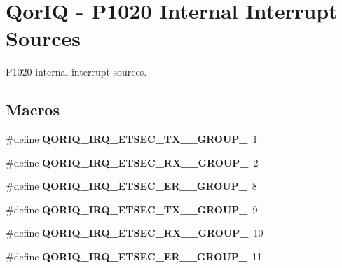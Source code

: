 \hypertarget{group__QoriqInterruptP1020}{}\section{Qor\+IQ -\/ P1020 Internal Interrupt Sources}
\label{group__QoriqInterruptP1020}


P1020 internal interrupt sources.  


\subsection*{Macros}
\begin{DoxyCompactItemize}
\item 
\mbox{\label{group__QoriqInterruptP1020_ga21b9ecdfa1405b1ab54c2769b2bcfaf0}} 
\#define {\bfseries Q\+O\+R\+I\+Q\+\_\+\+I\+R\+Q\+\_\+\+E\+T\+S\+E\+C\+\_\+\+T\+X\+\_\+\_\+\+G\+R\+O\+U\+P\+\_}~1
\item 
\mbox{\label{group__QoriqInterruptP1020_ga2333f3c95502a7760e3f6df947c5f6bf}} 
\#define {\bfseries Q\+O\+R\+I\+Q\+\_\+\+I\+R\+Q\+\_\+\+E\+T\+S\+E\+C\+\_\+\+R\+X\+\_\+\_\+\+G\+R\+O\+U\+P\+\_}~2
\item 
\mbox{\label{group__QoriqInterruptP1020_ga805e762d5c7560632994728ddf1782de}} 
\#define {\bfseries Q\+O\+R\+I\+Q\+\_\+\+I\+R\+Q\+\_\+\+E\+T\+S\+E\+C\+\_\+\+E\+R\+\_\+\_\+\+G\+R\+O\+U\+P\+\_}~8
\item 
\mbox{\label{group__QoriqInterruptP1020_ga2aa83a25aea914b654230c2cf051017f}} 
\#define {\bfseries Q\+O\+R\+I\+Q\+\_\+\+I\+R\+Q\+\_\+\+E\+T\+S\+E\+C\+\_\+\+T\+X\+\_\+\_\+\+G\+R\+O\+U\+P\+\_}~9
\item 
\mbox{\label{group__QoriqInterruptP1020_gae4ce5c1e80cdb1f9ddf25b489cd204cb}} 
\#define {\bfseries Q\+O\+R\+I\+Q\+\_\+\+I\+R\+Q\+\_\+\+E\+T\+S\+E\+C\+\_\+\+R\+X\+\_\+\_\+\+G\+R\+O\+U\+P\+\_}~10
\item 
\mbox{\label{group__QoriqInterruptP1020_ga0a6a5dee959702bd341700c01020b6ec}} 
\#define {\bfseries Q\+O\+R\+I\+Q\+\_\+\+I\+R\+Q\+\_\+\+E\+T\+S\+E\+C\+\_\+\+E\+R\+\_\+\_\+\+G\+R\+O\+U\+P\+\_}~11

\end{DoxyCompactItemize}
